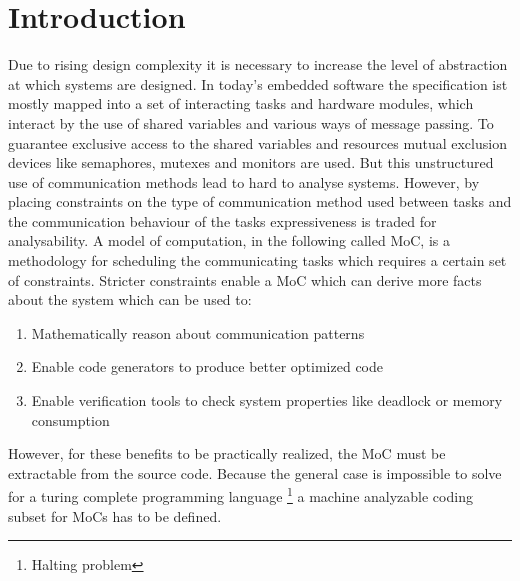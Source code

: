 \newcommand{\graphicPostfix}{pdf}
\newcommand{\resdir}{../../../HscdTeXRes/}
\newcommand{\code}[1]{{\bf #1}}
\newcommand{\SysteMoC}{{\bf SysteMoC}}
\newcommand{\SysteMoCV}{\SysteMoC{} {\bf 1.0}}



\usepackage{multirow}


\clearpage
\tableofcontents
\clearpage

\section{Introduction\label{intro}}
Due to rising design complexity it is necessary to increase
the level of abstraction at which systems are designed. In
today's embedded software the specification ist mostly mapped
into a set of interacting tasks and hardware modules, which 
interact by the use of shared variables and various ways of
message passing. To guarantee exclusive access to the shared
variables and resources mutual exclusion devices like semaphores,
mutexes and monitors are used. But this unstructured use
of communication methods lead to hard to analyse systems.
However, by placing constraints on the type of communication method
used between tasks and the communication behaviour of the tasks
expressiveness is traded for analysability. A model of computation,
in the following called MoC, is a methodology for scheduling
the communicating tasks which requires a certain set of constraints.
Stricter constraints enable a MoC which can derive more facts
about the system which can be used to:

\begin{enumerate}
\item Mathematically reason about communication patterns

\item Enable code generators to produce better optimized code

\item Enable verification tools to check system properties like
      deadlock or memory consumption
\end{enumerate}
However, for these benefits to be practically realized, the
MoC must be extractable from the source code. Because the general case
is impossible to solve for a turing complete programming language
\footnote{Halting problem} a machine analyzable coding subset for
MoCs has to be defined.

